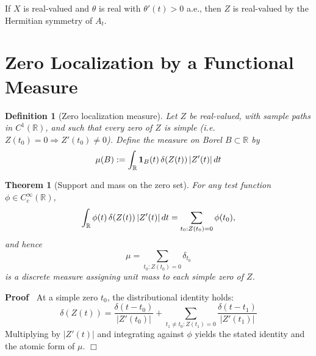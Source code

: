 \documentclass{article}
\newcommand{\assign}{:=}
\newenvironment{proof}{\noindent\textbf{Proof\ }}{\hspace*{\fill}$\Box$\medskip}
\newtheorem{definition}{Definition}
\newtheorem{theorem}{Theorem}
\begin{document}
\begin{remark}
   If $X$ is real-valued and $\theta$ is
  real with $\theta' (t) > 0$ a.e., then $Z$ is real-valued by the Hermitian
  symmetry of $A_t$.
\end{remark}

\section{Zero Localization by a Functional Measure}

\begin{definition}
  [Zero localization measure] Let $Z$ be real-valued, with sample paths in
  $C^1 (\mathbb{R})$, and such that every zero of $Z$ is simple (i.e. $Z (t_0)
  = 0 \Longrightarrow Z' (t_0) \neq 0$). Define the measure on Borel $B
  \subset \mathbb{R}$ by
  \begin{equation}
    \mu (B) \assign \int_{\mathbb{R}} \textbf{1}_B (t)  \hspace{0.17em} \delta
    (Z (t)) \hspace{0.17em} |Z' (t) |  \hspace{0.17em} dt
  \end{equation}
\end{definition}

\begin{theorem}
  [Support and mass on the zero set] For any test function $\phi \in
  C_c^{\infty} (\mathbb{R})$,
  \begin{equation}
    \int_{\mathbb{R}} \phi (t)  \hspace{0.17em} \delta (Z (t)) \hspace{0.17em}
    |Z' (t) |  \hspace{0.17em} dt = \sum_{t_0 : Z (t_0) = 0} \phi (t_0),
  \end{equation}
  and hence
  \begin{equation}
    \mu = \sum_{t_0 : Z (t_0) = 0} \delta_{t_0}
  \end{equation}
  is a discrete measure assigning unit mass to each simple zero of $Z$.
\end{theorem}

\begin{proof}
  At a simple zero $t_0$, the distributional identity holds:
  \begin{equation}
    \delta (Z (t)) = \frac{\delta (t - t_0)}{|Z' (t_0) |} + \sum_{t_1 \neq t_0
    : Z (t_1) = 0} \frac{\delta (t - t_1)}{|Z' (t_1) |}
  \end{equation}
  Multiplying by $|Z' (t) |$ and integrating against $\phi$ yields the stated
  identity and the atomic form of $\mu$.
\end{proof}
\end{document}
